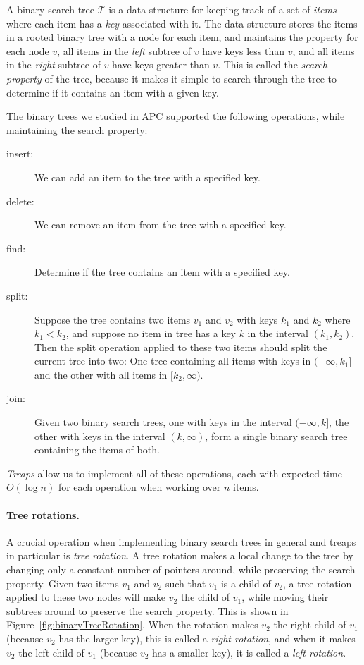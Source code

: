 A binary search tree $\mathcal{T}$ is a data structure for keeping track of a set of \emph{items} where each item has a \emph{key} associated with it.
The data structure stores the items in a rooted binary tree with a node for each item, and maintains the property for each node $v$, all items in the \emph{left} subtree of $v$ have keys less than $v$, and all items in the \emph{right} subtree of $v$ have keys greater than $v$.
This is called the \emph{search property} of the tree, because it makes it simple to search through the tree to determine if it contains an item with a given key.

The binary trees we studied in APC supported the following operations, while maintaining the search property:
\begin{description}
\item[insert:] We can add an item to the tree with a specified key.
\item[delete:] We can remove an item from the tree with a specified key.
\item[find:] Determine if the tree contains an item with a specified key.
\item[split:] Suppose the tree contains two items $v_1$ and $v_2$ with keys $k_1$ and $k_2$ where $k_1 < k_2$, and suppose no item in tree has a key $k$ in the interval $(k_1,k_2)$. Then the split operation applied to these two items should split the current tree into two: One tree containing all items with keys in $(-\infty,k_1]$ and the other with all items in $[k_2,\infty)$.
\item[join:] Given two binary search trees, one with keys in the interval $(-\infty,k]$, the other with keys in the interval $(k,\infty)$, form a single binary search tree containing the items of both.
\end{description}

\emph{Treaps} allow us to implement all of these operations, each with expected time $O(\log n)$ for each operation when working over $n$ items.

\paragraph{Tree rotations.} A crucial operation when implementing binary search trees in general and treaps in particular is \emph{tree rotation}. A tree rotation makes a local change to the tree by changing only a constant number of pointers around, while preserving the search property.
Given two items $v_1$ and $v_2$ such that $v_1$ is a child of $v_2$, a tree rotation applied to these two nodes will make $v_2$ the child of $v_1$, while moving their subtrees around to preserve the search property. This is shown in Figure~\ref{fig:binaryTreeRotation}.
When the rotation makes $v_2$ the right child of $v_1$ (because $v_2$ has the larger key), this is called a \emph{right rotation}, and when it makes $v_2$ the left child of $v_1$ (because $v_2$ has a smaller key), it is called a \emph{left rotation}.

